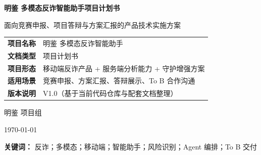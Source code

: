 \documentclass[UTF8,a4paper,12pt]{ctexart}
\begin{document}
\begin{titlepage}
    \centering
    \vspace*{2.8cm}
    {\bfseries 明鉴 多模态反诈智能助手项目计划书\par}
    \vspace{1.2cm}
    {面向竞赛申报、项目答辩与方案汇报的产品技术实施方案\par}
    \vspace{2.2cm}
    \renewcommand{\arraystretch}{1.6}
    \begin{tabular}{>{\bfseries}p{3.2cm}p{8.6cm}}
        项目名称 & 明鉴 多模态反诈智能助手 \\
        文档类型 & 项目计划书 \\
        项目形态 & 移动端反诈产品 + 服务端分析能力 + 守护增强方案 \\
        适用场景 & 竞赛申报、方案汇报、答辩展示、To B 合作沟通 \\
        版本说明 & V1.0（基于当前代码仓库与配套文档整理） \\
    \end{tabular}
    \vfill
    {明鉴 项目组\par}
    \vspace{0.4cm}
    {\today\par}
\end{titlepage}


\begin{abstract}
明鉴 多模态反诈智能助手面向电信网络诈骗高发、诈骗话术快速演化以及移动端风险线索碎片化的现实问题，提出“文本/短信 + 语音/电话 + 截图/图片”协同输入的移动端反诈方案。项目以手机端为核心落地入口，围绕风险识别、解释说明、处置建议、报告生成、长期记忆与守护联动构建完整闭环；在工程实现上，当前仓库已形成移动端页面与路由、状态与本地存储、服务端接口、风险分析引擎、语音转写、报告生成、聊天助手与 Android 守护增强模块，并为检索增强、大模型解释与多 Agent 编排预留扩展接口。

本计划书在现有代码与文档事实基础上，系统阐述项目的问题场景、用户需求、产品方案、To B 商业计划、系统架构、核心技术路线、模块拆分、知识底座建设、测试验证、落地展示与项目管理安排。文中涉及商业模式、行业拓展与部分智能体拆分方案时，采用“拟”“计划”“可”“预期”等稳健表述，作为后续试点与竞赛答辩的实施规划，而非既有签约或既有营收事实。
\end{abstract}

\noindent\textbf{关键词：} 反诈；多模态；移动端；智能助手；风险识别；Agent 编排；To B 交付
\end{document}

